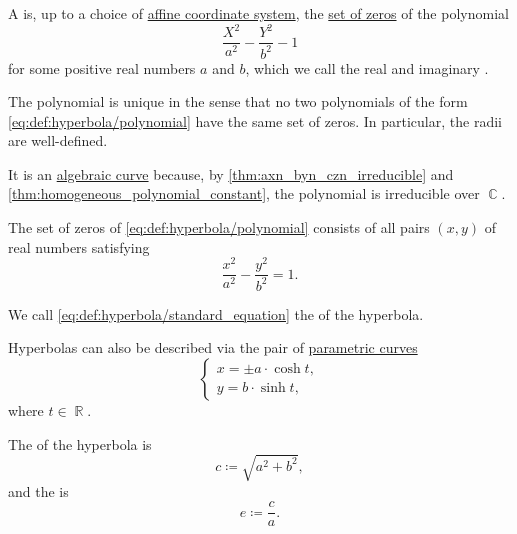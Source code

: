 \begin{definition}\label{def:hyperbola}
  A  is, up to a choice of \hyperref[def:affine_coordinate_system]{affine coordinate system}, the \hyperref[def:polynomial_root]{set of zeros} of the polynomial
  \begin{equation}\label{eq:def:hyperbola/polynomial}
    \frac {X^2} {a^2} - \frac {Y^2} {b^2} - 1
  \end{equation}
  for some positive real numbers \( a \) and \( b \), which we call the real and imaginary .

  The polynomial is unique in the sense that no two polynomials of the form \eqref{eq:def:hyperbola/polynomial} have the same set of zeros. In particular, the radii are well-defined.

  It is an \hyperref[def:affine_algebraic_set/curve]{algebraic curve} because, by \cref{thm:axn_byn_czn_irreducible} and \cref{thm:homogeneous_polynomial_constant}, the polynomial is irreducible over \( \BbbC \).

  \begin{thmenum}
     The set of zeros of \eqref{eq:def:hyperbola/polynomial} consists of all pairs \( (x, y) \) of real numbers satisfying
    \begin{equation}\label{eq:def:hyperbola/standard_equation}
      \frac {x^2} {a^2} - \frac {y^2} {b^2} = 1.
    \end{equation}

    We call \eqref{eq:def:hyperbola/standard_equation} the  of the hyperbola.

     Hyperbolas can also be described via the pair of \hyperref[def:parametric_curve]{parametric curves}
    \begin{equation}\label{eq:def:hyperbola/parametric_equation}
      \begin{cases}
        x = \pm a \cdot \cosh t, \\
        y = b \cdot \sinh t,
      \end{cases}
    \end{equation}
    where \( t \in \BbbR \).

     The  of the hyperbola is
    \begin{equation*}
      c \coloneq \sqrt{ a^2 + b^2 },
    \end{equation*}
    and the  is
    \begin{equation*}
      e \coloneqq \frac c a.
    \end{equation*}


\end{thmenum}
\end{definition}
